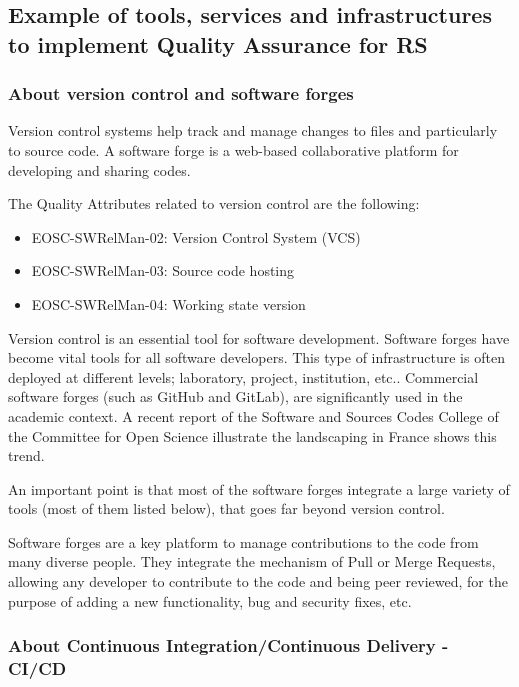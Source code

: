 \subsection{Example of tools, services and infrastructures to implement Quality Assurance for RS}

\subsubsection{About version control and software forges}

Version control systems help track and manage changes to files and particularly to source code. A software forge is a web-based collaborative platform for developing and sharing codes.

The Quality Attributes related to version control are the following:

\begin{itemize}
  \item EOSC-SWRelMan-02: Version Control System (VCS)
  \item EOSC-SWRelMan-03: Source code hosting
  \item EOSC-SWRelMan-04: Working state version
\end{itemize}

Version control is an essential tool for software development. Software forges have become vital tools for all software developers. This type of infrastructure is often deployed at different levels; laboratory, project, institution, etc.. Commercial software forges (such as GitHub and GitLab), are significantly used in the academic context. A recent report of the Software and Sources Codes College of the Committee for Open Science illustrate the landscaping in France \cite{leberre:hal-04208924} shows this trend.

An important point is that most of the software forges integrate a large variety of tools (most of them listed below), that goes far beyond version control.

Software forges are a key platform to manage contributions to the code from many diverse people. They integrate the mechanism of Pull or Merge Requests, allowing any developer to contribute to the code and being peer reviewed, for the purpose of adding a new functionality, bug and security fixes, etc.

\subsubsection{About Continuous Integration/Continuous Delivery - CI/CD}
\label{sec_cicd}

